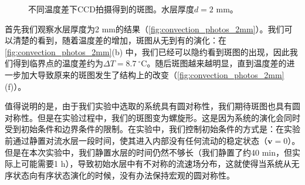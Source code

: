 \documentclass[font=default]{mpltx}
\begin{document}
\begin{figure}
    \caption{不同温度差下CCD拍摄得到的斑图。水层厚度$d=2$ mm。}
    \label{fig:convection_photos_2mm}
\end{figure}

首先我们观察水层厚度为2 mm的结果（\autoref{fig:convection_photos_2mm}）。我们可以清楚的看到，随着温度差的增加，斑图从无到有的演化：在\autoref{fig:convection_photos_2mm}(b) 中，我们已经可以隐约看到斑图的出现，因此我们得到临界点的温度差约为$\Delta T=8.7\ ^\circ\text{C}$。随后斑图越来越明显，直到温度差的进一步加大导致原来的斑图发生了结构上的改变（\autoref{fig:convection_photos_2mm}(f)）。

值得说明的是，由于我们实验中选取的系统具有圆对称性，我们期待斑图也具有圆对称性。但是在实验过程中，我们的斑图变为螺旋形。这是因为系统的演化会同时受到初始条件和边界条件的限制。在实验中，我们控制初始条件的方式是：在实验前通过静置对流水层一段时间，使其进入内部没有任何流动的稳定状态（$\bm{v}=0$）。但是在本次实验中，我们静置水层的时间仍然不够长（我们静置了约40 min，但实际上可能需要1 h），导致初始水层中有不对称的流速场分布，这就使得当系统从无序状态向有序状态演化的时候，没有办法保持宏观的圆对称性。
\end{document}
